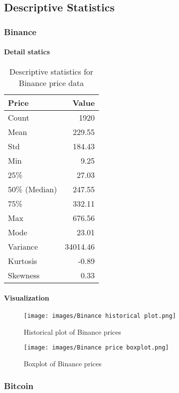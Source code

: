 \documentclass{ieeeojies}
\begin{document}
\subsection{Descriptive Statistics}
\subsubsection{Binance}
\paragraph{Detail statics}
\begin{table}[H]
\centering
\begin{tabular}{|l|r|}
\hline
\textbf{Price} & \textbf{Value} \\
\hline
Count & 1920 \\
\hline
Mean & 229.55 \\
\hline
Std & 184.43 \\
\hline
Min & 9.25 \\
\hline
25\% & 27.03 \\
\hline
50\% (Median) & 247.55 \\
\hline
75\% & 332.11 \\
\hline
Max & 676.56 \\
\hline
Mode & 23.01 \\
\hline
Variance & 34014.46 \\
\hline
Kurtosis & -0.89 \\
\hline
Skewness & 0.33 \\
\hline
\end{tabular}
\caption{Descriptive statistics for Binance price data}
\label{table:binance_statistics}
\end{table}

\paragraph{Visualization}
\begin{figure}[h!]
    \centering
    \texttt{[image: images/Binance historical plot.png]}
    \caption{Historical plot of Binance prices}
    \label{fig:binance_historical}
\end{figure}

\begin{figure}[h!]
    \centering
    \texttt{[image: images/Binance price boxplot.png]}
    \caption{Boxplot of Binance prices}
    \label{fig:binance_boxplot}
\end{figure}
\subsubsection{Bitcoin}
\end{document}
